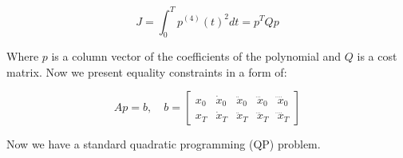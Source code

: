 \documentclass[12pt]{article}
\begin{document}
\begin{equation}
    J = \int_0^T p^{(4)}(t)^2 dt = p^TQp
\end{equation}

Where $p$ is a column vector of the coefficients of the polynomial and $Q$ is a cost matrix. Now we present equality constraints in a form of:

\begin{equation}
    Ap = b, \quad b = \begin{bmatrix}
        x_0 & \dot{x}_0 & \ddot{x}_0 & \dddot{x}_0 & \ddddot{x}_0 \\
        x_T & \dot{x}_T & \ddot{x}_T & \dddot{x}_T & \ddddot{x}_T
    \end{bmatrix}
\end{equation}

Now we have a standard quadratic programming (QP) problem.
\end{document}

